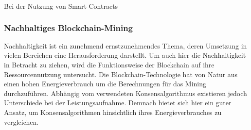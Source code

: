 Bei der Nutzung von Smart Contracts 
\cite[p.~14]{pirafelnerblockchaintechnologie}



\subsubsection{Nachhaltiges Blockchain-Mining}
Nachhaltigkeit ist ein zunehmend ernstzunehmendes Thema, deren Umsetzung in vielen Bereichen eine 
Herausforderung darstellt. Um auch hier die Nachhaltigkeit in Betracht zu ziehen, wird die 
Funktionsweise der Blockchain auf ihre Ressourcennutzung untersucht. 
Die Blockchain-Technologie hat von Natur aus einen hohen Energieverbrauch um die Berechnungen für das 
Mining durchzuführen. Abhängig vom verwendeten Konsensalgorithmus existieren jedoch Unterschiede bei 
der Leistungsaufnahme. 
\cite[p.~2]{Athar2024BC_Sustainability}
Demnach bietet sich hier ein guter Ansatz, um Konsensalgorithmen hinsichtlich ihres Energieverbrauches
zu vergleichen.

